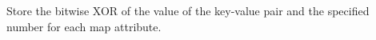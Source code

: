 Store the bitwise XOR of the value of the key-value pair and the specified
number for each map attribute.

